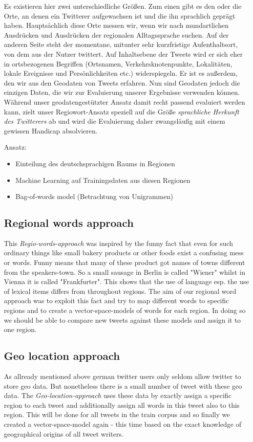 \documentclass[../Main.tex]{subfiles}
\begin{document}
Es existieren hier zwei unterschiedliche Größen. Zum einen gibt es den oder die Orte, an denen ein Twitterer aufgewachsen ist und die ihn sprachlich geprägt haben. Hauptsächlich diese Orte messen wir, wenn wir nach mundartlichen Ausdrücken und Ausdrücken der regionalen Alltagssprache suchen. Auf der anderen Seite steht der momentane, mitunter sehr kurzfristige Aufenthaltsort, von dem aus der Nutzer twittert. Auf Inhaltsebene der Tweets wird er sich eher in ortsbezogenen Begriffen (Ortsnamen, Verkehrsknotenpunkte, Lokalitäten, lokale Ereignisse und Persönlichkeiten etc.) widerspiegeln. Er ist es außerdem, den wir aus den Geodaten von Tweets erfahren. Nun sind Geodaten jedoch die einzigen Daten, die wir zur Evaluierung unserer Ergebnisse verwenden können. Während unser geodatengestützter Ansatz damit recht passend evaluiert werden kann, zielt unser Regiowort-Ansatz speziell auf die Größe \textit{sprachliche Herkunft des Twitterers} ab und wird die Evaluierung daher zwangsläufig mit einem gewissen Handicap absolvieren.

Ansatz:
\begin{itemize}
\item Einteilung des deutschsprachigen Raums in Regionen
\item Machine Learning auf Trainingsdaten aus diesen Regionen
\item Bag-of-words model (Betrachtung von Unigrammen)
\end{itemize}

\subsection{Regional words approach}
This \emph{Regio-words-approach} was inspired by the funny fact that even for such ordinary things like small bakery products or other foods exist a confusing mess or words. Funny means that many of these product got names of towns different from the speakers-town. So a small sausage in Berlin is called "Wiener" whilst in Vienna it is called "Frankfurter". This shows that the use of language esp. the use of lexical items differs from throughout regions. The aim of our regional word approach was to exploit this fact and try to map different words to specific regions and to create a vector-space-models of words for each region. In doing so we should be able to compare new tweets against these models and assign it to one region. 
\subsection{Geo location approach}
As allready mentioned above german twitter users only seldom allow twitter to store geo data. But nonetheless there is a small number of tweet with these geo data. The \emph{Geo-location-approach} uses these data by exactly assign a specific region to each tweet and additionally assign all words in this tweet also to this region. This will be done for all tweets in the train corpus and so finally we created a vector-space-model again - this time based on the exact knowledge of geographical origins of all tweet writers. 
\end{document}

